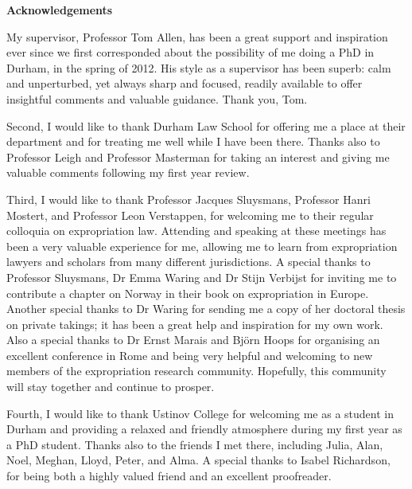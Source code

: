 
\cleardoublepage
\begin{quoting}
  \singlespace
    \begin{center}
  {\LARGE \bfseries  Acknowledgements}\\
  \vspace*{0.5cm}
  \end{center}
\noindent

My supervisor, Professor Tom Allen, has been a great support and inspiration ever since we first corresponded about the possibility of me doing a PhD in Durham, in the spring of 2012. His style as a supervisor has been superb: calm and unperturbed, yet always sharp and focused, readily available to offer insightful comments and valuable guidance. Thank you, Tom.

Second, I would like to thank Durham Law School for offering me a place at their department and for treating me well while I have been there. Thanks also to Professor Leigh and Professor Masterman for taking an interest and giving me valuable comments following my first year review.

Third, I would like to thank Professor Jacques Sluysmans, Professor Hanri Mostert, and Professor Leon Verstappen, for welcoming me to their regular colloquia on expropriation law. Attending and speaking at these meetings has been a very valuable experience for me, allowing me to learn from expropriation lawyers and scholars from many different jurisdictions. A special thanks to Professor Sluysmans, Dr Emma Waring and Dr Stijn Verbijst for inviting me to contribute a chapter on Norway in their book on expropriation in Europe. Another special thanks to Dr Waring for sending me a copy of her doctoral thesis on private takings; it has been a great help and inspiration for my own work. Also a special thanks to Dr Ernst Marais and Bj\"{o}rn Hoops for organising an excellent conference in Rome and being very helpful and welcoming to new members of the expropriation research community. Hopefully, this community will stay together and continue to prosper.

Fourth, I would like to thank Ustinov College for welcoming me as a student in Durham and providing a relaxed and friendly atmosphere during my first year as a PhD student. Thanks also to the friends I met there, including Julia, Alan, Noel, Meghan, Lloyd, Peter, and Alma. A special thanks to Isabel Richardson, for being both a highly valued friend and an excellent proofreader.


\end{quoting}

